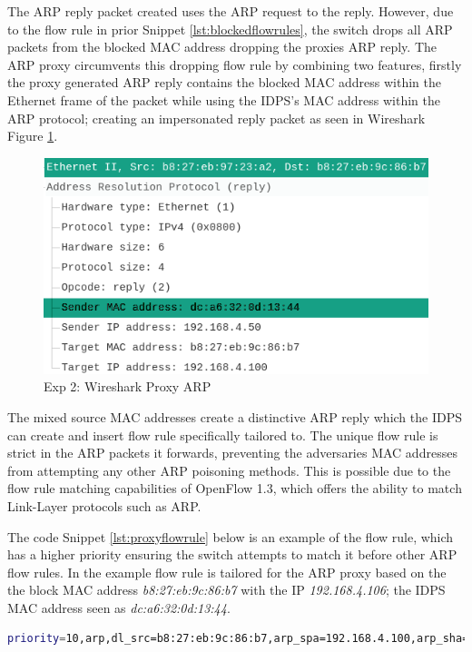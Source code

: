 \documentclass[12pt, oneside]{book}
\begin{document}
The ARP reply packet created uses the ARP request to the reply.
However, due to the flow rule in prior Snippet \ref{lst:blockedflowrules}, the switch drops all ARP packets from the blocked MAC address
dropping the proxies ARP reply.
The ARP proxy circumvents this dropping flow rule by combining two features, firstly the proxy generated ARP reply
contains the blocked MAC address within the Ethernet frame of the packet while using the IDPS's 
MAC address within the ARP protocol; creating an impersonated reply packet as seen in Wireshark Figure \ref{fig:wireflowProxy}.

\begin{figure}[H]
	\centering
	\includegraphics[scale=0.5]{../tests/RTT/proxy.png}
	\caption{Exp 2: Wireshark Proxy ARP}
	\label{fig:wireflowProxy}
\end{figure}

The mixed source MAC addresses create a distinctive ARP reply which the IDPS
can create and insert flow rule specifically tailored to.
The unique flow rule is strict in the ARP packets it forwards, preventing the adversaries MAC addresses from attempting 
any other ARP poisoning methods.
This is possible due to the flow rule matching capabilities of OpenFlow 1.3, which offers the ability to match Link-Layer
protocols such as ARP.

The code Snippet \ref{lst:proxyflowrule} below is an example of the flow rule, which has
a higher priority ensuring the switch attempts to match it before other ARP flow rules.
In the example flow rule is tailored for the ARP proxy based on the
the block MAC address \emph{b8:27:eb:9c:86:b7} with the IP \emph{192.168.4.106}; the IDPS MAC address seen as \emph{dc:a6:32:0d:13:44}.

\begin{lstlisting}[language=Bash,caption={Proxy ARP reply Flow Rule for blocked MAC},captionpos=b,label={lst:proxyflowrule}]
	priority=10,arp,dl_src=b8:27:eb:9c:86:b7,arp_spa=192.168.4.100,arp_sha=dc:a6:32:0d:13:44 actions=NORMAL
\end{lstlisting}
\end{document}
